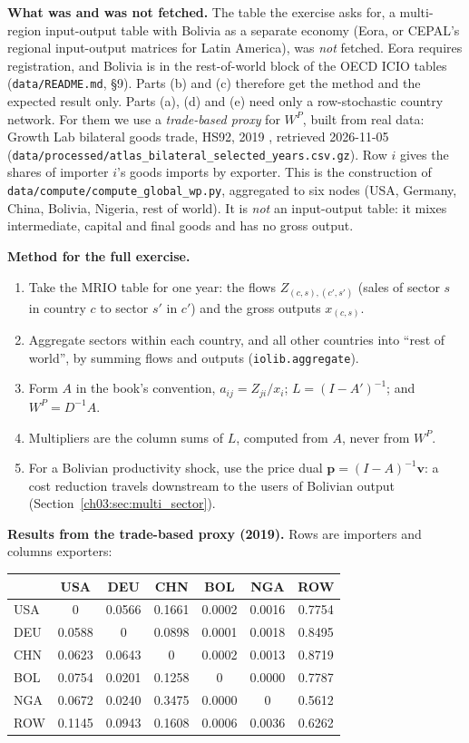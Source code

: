 \documentclass[../solutions_manual.tex]{subfiles}
\begin{document}
\textbf{What was and was not fetched.} The table the exercise asks for, a multi-region input-output table with Bolivia as a separate economy (Eora, or CEPAL's regional input-output matrices for Latin America), was \emph{not} fetched. Eora requires registration, and Bolivia is in the rest-of-world block of the OECD ICIO tables (\texttt{data/README.md}, \S9). Parts (b) and (c) therefore get the method and the expected result only. Parts (a), (d) and (e) need only a row-stochastic country network. For them we use a \emph{trade-based proxy} for $W^P$, built from real data: Growth Lab bilateral goods trade, HS92, 2019 \citep{growthlab2026atlas}, retrieved 2026-11-05 (\texttt{data/processed/atlas\_bilateral\_selected\_years.csv.gz}). Row $i$ gives the shares of importer $i$'s goods imports by exporter. This is the construction of \texttt{data/compute/compute\_global\_wp.py}, aggregated to six nodes (USA, Germany, China, Bolivia, Nigeria, rest of world). It is \emph{not} an input-output table: it mixes intermediate, capital and final goods and has no gross output.

\textbf{Method for the full exercise.}
\begin{enumerate}
\item Take the MRIO table for one year: the flows $Z_{(c,s),(c',s')}$ (sales of sector $s$ in country $c$ to sector $s'$ in $c'$) and the gross outputs $x_{(c,s)}$.
\item Aggregate sectors within each country, and all other countries into ``rest of world'', by summing flows and outputs (\texttt{iolib.aggregate}).
\item Form $A$ in the book's convention, $a_{ij} = Z_{ji}/x_i$; $L = (I - A')^{-1}$; and $W^P = D^{-1}A$.
\item Multipliers are the column sums of $L$, computed from $A$, never from $W^P$.
\item For a Bolivian productivity shock, use the price dual $\mathbf p = (I - A)^{-1}\mathbf v$: a cost reduction travels downstream to the users of Bolivian output (Section~\ref{ch03:sec:multi_sector}).
\end{enumerate}

\textbf{Results from the trade-based proxy (2019).} Rows are importers and columns exporters:
\begin{center}
\small
\begin{tabular}{lcccccc}
\toprule
& USA & DEU & CHN & BOL & NGA & ROW \\
\midrule
USA & 0 & 0.0566 & 0.1661 & 0.0002 & 0.0016 & 0.7754\\
DEU & 0.0588 & 0 & 0.0898 & 0.0001 & 0.0018 & 0.8495\\
CHN & 0.0623 & 0.0643 & 0 & 0.0002 & 0.0013 & 0.8719\\
BOL & 0.0754 & 0.0201 & 0.1258 & 0 & 0.0000 & 0.7787\\
NGA & 0.0672 & 0.0240 & 0.3475 & 0.0000 & 0 & 0.5612\\
ROW & 0.1145 & 0.0943 & 0.1608 & 0.0006 & 0.0036 & 0.6262\\
\bottomrule
\end{tabular}
\end{center}
\end{document}
